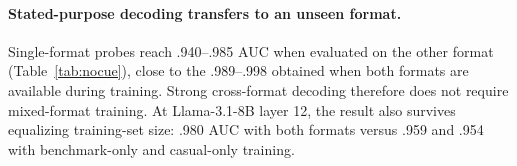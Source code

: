 \documentclass{article}
\begin{document}
\paragraph{Stated-purpose decoding transfers to an unseen format.}
Single-format probes reach .940--.985 AUC when evaluated on the other format
(Table~\ref{tab:nocue}), close to the .989--.998 obtained when both formats are
available during training. Strong cross-format decoding therefore does not
require mixed-format training. At Llama-3.1-8B layer 12, the result also
survives equalizing training-set size: .980 AUC with both formats versus .959
and .954 with benchmark-only and casual-only training.
\end{document}
